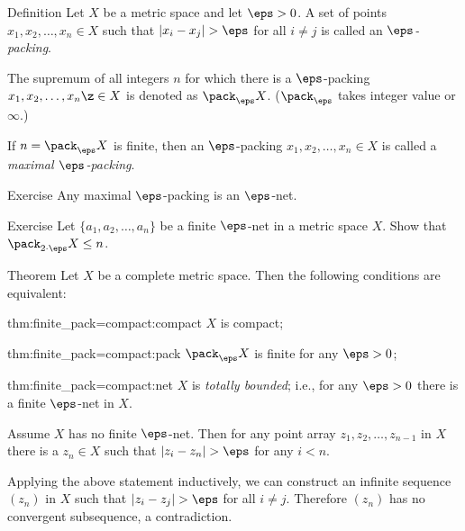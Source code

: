 \begin{thm}{Definition}
Let $X$ be a metric space and let $\eps>0$.
A set of points $x_1,x_2,\dots,x_n\in X$ such that $|x_i-x_j|>\eps$ for all $i\not=j$ is called an \emph{$\eps$-packing}.

The supremum of all integers $n$ for which 
there is a $\eps$-packing $x_1,x_2,\dots,x_n\z\in X$ 
is denoted as $\pack_\eps X$.
($\pack_\eps$ takes integer value or $\infty$.)

If $n=\pack_\eps X$ is finite,
then an $\eps$-packing $x_1,x_2,\dots,x_n\in X$ 
is called a \emph{maximal $\eps$-packing}.
\end{thm}

\begin{thm}{Exercise}\label{ex:packing=net}
Any maximal $\eps$-packing is an $\eps$-net.
\end{thm}

\begin{thm}{Exercise}\label{ex:net=2packing}
Let $\{a_1,a_2,\dots,a_n\}$ be a finite $\eps$-net in a metric space $X$.
Show that $\pack_{2\cdot\eps}X\le n$.
\end{thm}

\begin{thm}{Theorem}\label{thm:finite_pack=compact}
Let $X$ be a complete metric space.
Then the following conditions are equivalent:

\begin{subthm}{thm:finite_pack=compact:compact}
$X$ is compact;
\end{subthm}

\begin{subthm}{thm:finite_pack=compact:pack}
$\pack_\eps X$ is finite for any $\eps>0$;
\end{subthm}

\begin{subthm}{thm:finite_pack=compact:net}
$X$ is \emph{totally bounded};
i.e., for any $\eps>0$ there is a finite $\eps$-net in $X$.
\end{subthm}

\end{thm}

Assume $X$ has no finite $\eps$-net.
Then for any point array $z_1,z_2,\dots,z_{n-1}$ in $X$
there is a $z_n\in X$
such that $|z_i-z_n|>\eps$ for any $i<n$.

Applying the above statement inductively, we can construct an infinite sequence $(z_n)$ in $X$
such that $|z_i-z_j|>\eps$ for all $i\not=j$.
Therefore $(z_n)$ has no convergent subsequence,
a contradiction.

